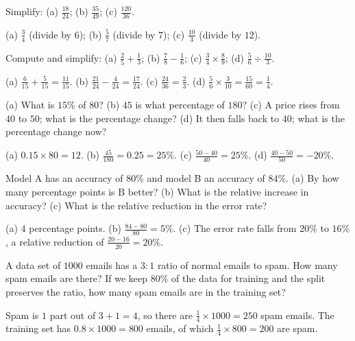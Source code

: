 \sectionexercises

\begin{exercise}
Simplify: (a) $\tfrac{18}{24}$; (b) $\tfrac{35}{49}$; (c) $\tfrac{120}{36}$.
\end{exercise}
\begin{solution}
(a) $\tfrac34$ (divide by $6$); (b) $\tfrac57$ (divide by $7$);
(c) $\tfrac{10}{3}$ (divide by $12$).
\end{solution}

\begin{exercise}
Compute and simplify: (a) $\tfrac25 + \tfrac13$; (b) $\tfrac78 - \tfrac16$;
(c) $\tfrac34 \times \tfrac89$; (d) $\tfrac56 \div \tfrac{10}{3}$.
\end{exercise}
\begin{solution}
(a) $\tfrac{6}{15} + \tfrac{5}{15} = \tfrac{11}{15}$.
(b) $\tfrac{21}{24} - \tfrac{4}{24} = \tfrac{17}{24}$.
(c) $\tfrac{24}{36} = \tfrac23$.
(d) $\tfrac56 \times \tfrac{3}{10} = \tfrac{15}{60} = \tfrac14$.
\end{solution}

\begin{exercise}
(a) What is $15\%$ of $80$? (b) $45$ is what percentage of $180$? (c) A
price rises from $40$ to $50$; what is the percentage change? (d) It then
falls back to $40$; what is the percentage change now?
\end{exercise}
\begin{solution}
(a) $0.15 \times 80 = 12$. (b) $\tfrac{45}{180} = 0.25 = 25\%$.
(c) $\tfrac{50-40}{40} = 25\%$. (d) $\tfrac{40-50}{50} = -20\%$.
\end{solution}

\begin{exercise}
Model A has an accuracy of $80\%$ and model B an accuracy of $84\%$.
(a) By how many percentage points is B better? (b) What is the relative
increase in accuracy? (c) What is the relative reduction in the error rate?
\end{exercise}
\begin{solution}
(a) $4$ percentage points. (b) $\tfrac{84 - 80}{80} = 5\%$. (c) The error rate
falls from $20\%$ to $16\%$, a relative reduction of $\tfrac{20-16}{20} =
20\%$.
\end{solution}

\begin{exercise}
A data set of $1000$ emails has a $3:1$ ratio of normal emails to spam. How
many spam emails are there? If we keep $80\%$ of the data for training and
the split preserves the ratio, how many spam emails are in the training set?
\end{exercise}
\begin{solution}
Spam is $1$ part out of $3+1=4$, so there are $\tfrac14 \times 1000 = 250$ spam
emails. The training set has $0.8 \times 1000 = 800$ emails, of which
$\tfrac14 \times 800 = 200$ are spam.
\end{solution}

